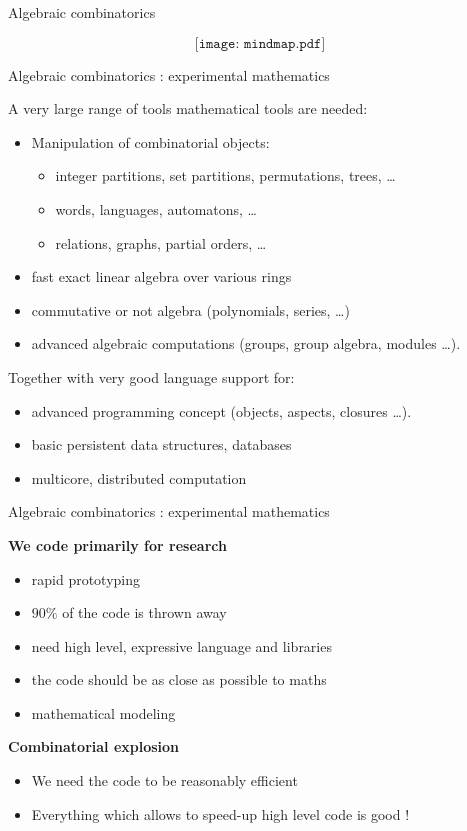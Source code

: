 \documentclass[compress,11pt]{beamer}
\begin{document}
\begin{frame}{Algebraic combinatorics}

\[\texttt{[image: mindmap.pdf]}\]
\end{frame}
\begin{frame}{Algebraic combinatorics : experimental mathematics}

A very large range of tools mathematical tools are needed:
\begin{itemize}
\item Manipulation of combinatorial objects:
  \begin{itemize}
  \item integer partitions, set partitions, permutations, trees, \dots
  \item words, languages, automatons, \dots
  \item relations, graphs, partial orders, \dots
  \end{itemize}
\item fast exact linear algebra over various rings
\item commutative or not algebra (polynomials, series, \dots)
\item advanced algebraic computations (groups, group algebra, modules \dots).
\end{itemize}
\bigskip\pause

Together with very good language support for:
\begin{itemize}
\item advanced programming concept (objects, aspects, closures \dots).
\item basic persistent data structures, databases
\item multicore, distributed computation
\end{itemize}
\end{frame}

\begin{frame}{Algebraic combinatorics : experimental mathematics}

\textbf{\Large We code primarily for research}
\begin{itemize}
\item rapid prototyping
\item $90\%$ of the code is thrown away
\bigskip\pause
\item need high level, expressive language and libraries
\item the code should be as close as possible to maths
\item mathematical modeling
\end{itemize}
\bigskip\pause
\textbf{\Large Combinatorial explosion}
\begin{itemize}
\item We need the code to be reasonably efficient
\item Everything which allows to speed-up high level code is good !
\end{itemize}
\end{frame}
\end{document}
